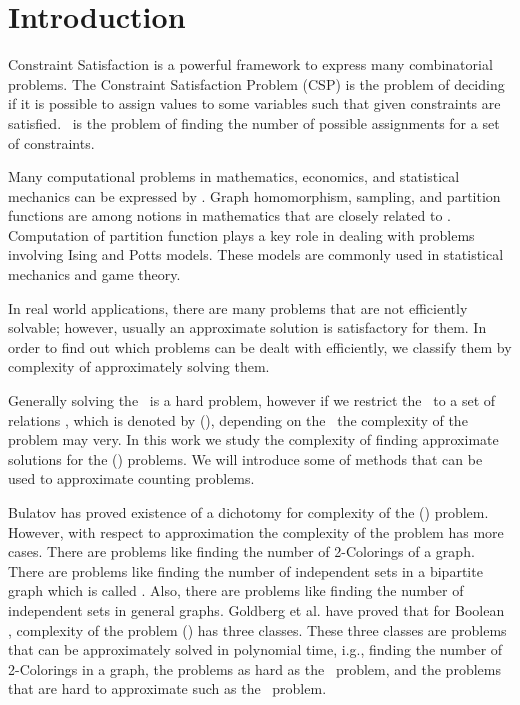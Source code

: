 \chapter{Introduction}
Constraint Satisfaction is a powerful framework to express many combinatorial problems.
The Constraint Satisfaction Problem (CSP) is the problem of deciding if it is possible to
assign values to some variables such that given constraints are satisfied. \ccsp\ 
is the problem of finding the number of possible assignments for a set of constraints.

Many computational problems in mathematics, economics, and statistical mechanics
can be expressed by \ccsp\@. Graph homomorphism, sampling,
and partition functions are among notions in mathematics
that are closely related to \ccsp\@. Computation of partition function plays a key role
in dealing with problems involving Ising and Potts models. These models are
commonly used in statistical mechanics and game theory.
 
In real world applications, there are many problems that are not efficiently solvable;
however, usually an approximate solution is satisfactory for them. 
In order to find out which problems can be dealt with efficiently, we classify them
by complexity of approximately solving them.

Generally solving the \ccsp\ is a hard problem, however if we restrict the
\ccsp\ to a set of relations \mrelset, which is denoted by \ccsp(\mrelset),
depending on the \mrelset\ the complexity of the problem may very.
In this work we study the complexity of finding approximate solutions for the 
\ccsp(\mrelset) problems.
We will introduce some of methods that can be used to approximate counting problems.

Bulatov \cite{Bulatov} has proved existence of a dichotomy for complexity of the
\ccsp(\mrelset) problem. However, with respect to approximation the complexity of 
the problem has more cases. There are problems like finding the number of 2-Colorings
of a graph. There are problems like finding the
number of independent sets in a bipartite graph which is called \cbis\@.
Also, there are problems like finding the number of independent sets in general graphs.
Goldberg et al. \cite{Trichotomy} have proved that for Boolean \mrelset,
complexity of the problem \ccsp(\mrelset) has three classes. These three classes are
problems that can be approximately solved in polynomial time, i.g., finding the
number of 2-Colorings in a graph, the problems as hard as the \cbis\ problem, and the
problems that are hard to approximate such as the \cisp\ problem.

